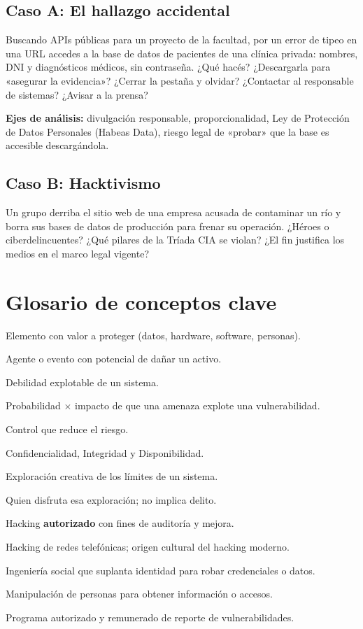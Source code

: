 \documentclass[11pt,a4paper]{article}
\begin{document}
\subsection{Caso A: El hallazgo accidental}
Buscando APIs públicas para un proyecto de la facultad, por un error de tipeo en una URL accedes a la base de datos de pacientes de una clínica privada: nombres, DNI y diagnósticos médicos, sin contraseña. ¿Qué hacés? ¿Descargarla para «asegurar la evidencia»? ¿Cerrar la pestaña y olvidar? ¿Contactar al responsable de sistemas? ¿Avisar a la prensa?

\textbf{Ejes de análisis:} divulgación responsable, proporcionalidad, Ley de Protección de Datos Personales (Habeas Data), riesgo legal de «probar» que la base es accesible descargándola.

\subsection{Caso B: Hacktivismo}
Un grupo derriba el sitio web de una empresa acusada de contaminar un río y borra sus bases de datos de producción para frenar su operación. ¿Héroes o ciberdelincuentes? ¿Qué pilares de la Tríada CIA se violan? ¿El fin justifica los medios en el marco legal vigente?

\section{Glosario de conceptos clave}
\begin{description}[leftmargin=!, labelwidth=3.2cm, font=\bfseries]
  \item[Activo] Elemento con valor a proteger (datos, hardware, software, personas).
  \item[Amenaza] Agente o evento con potencial de dañar un activo.
  \item[Vulnerabilidad] Debilidad explotable de un sistema.
  \item[Riesgo] Probabilidad $\times$ impacto de que una amenaza explote una vulnerabilidad.
  \item[Salvaguarda] Control que reduce el riesgo.
  \item[Tríada CIA] Confidencialidad, Integridad y Disponibilidad.
  \item[Hacking] Exploración creativa de los límites de un sistema.
  \item[Hacker] Quien disfruta esa exploración; no implica delito.
  \item[Hacking ético] Hacking \textbf{autorizado} con fines de auditoría y mejora.
  \item[Phreaking] Hacking de redes telefónicas; origen cultural del hacking moderno.
  \item[Phishing] Ingeniería social que suplanta identidad para robar credenciales o datos.
  \item[Ingeniería social] Manipulación de personas para obtener información o accesos.
  \item[Bug Bounty] Programa autorizado y remunerado de reporte de vulnerabilidades.
\end{description}
\end{document}
